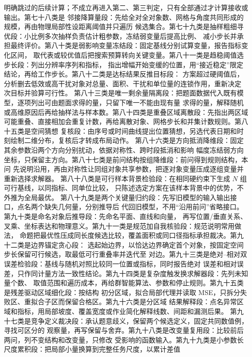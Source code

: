 明确跳过的后续计算；不成立再进入第二、第三判定，只有全部通过才计算接收或输出。第七十八类是
邻接降算量段：先给全对全对象数、网格与角度共同形成的规模，再由物理局部性设距离阈值并只遍历
候选集合。第七十九类是抽样粗细寻优段：小比例多次抽样负责估计粗参数，冻结弱变量后提高比例、
减小步长并承担最终评价。第八十类是弱影响变量冻结段：固定基线分别试算变量，报告指标变化区间，
取代表或较优值后把搜索预算转向关键变量。第八十一类是趋稳阈值选步长段：列出分辨率序列和指标，
指出增幅开始变缓的位置，用“接近稳定”限定结论，再给工作步长。第八十二类是达标结果反推目标段：
方案超过硬阈值后，分析删去低效或高干扰对象对总量、面积、干扰和单位量的连锁作用，重新决定
次目标并验算可行性。
第八十三类是唯一剩余量隔离段：把题面数据代入既有模型，逐项列出可由题面求得的量，只留下唯一不能由现有量
求得的量，解释随机或高维原因后再给抽样法与样本数。第八十四类是重叠区域离散段：先指出两区域
可能重叠、直接相加会重复计数，再给离散对象、网格步长和并集计数规则。第八十五类是空间猜想
复核段：由序号或时间曲线提出位置猜想，另选代表日期和时刻绘制二维分布，复核后才转成布局动作。
第八十六类是方向抵消降维段：固定其余参数沿两个方向分别扰动，依据对称性、跨时段抵消和影响
幅度冻结弱方向坐标，只保留主方向。第八十七类是前问结构按组降维段：前问得到规则结构，本问
先说明沿用，再由对称性让同组对象共享参数，把逐对象变量压成逐组变量并重新选择求解器。
第八十八类是可行样本背景检验段：在相同硬约束下生成 $N$ 组可行基线，以同指标、同单位比较，
只陈述选定方案在该样本背景中的优势，不外推为全局最优。
第八十九类是两个关键量归约段：先写旧模型的输入输出接口，点名两个缺失几何量，分别推导后
代回旧模型，不用“沿用前问”省略接口。第九十类是命名对象后推导段：先命名平面、直线和向量，
再写位置/垂直关系、叉乘、坐标表达和物理意义。第九十一类是规范加自我核验段：规范说明常用做法，
命题把最优性压成同长度候选比较，覆盖面积或同口径指标承担裁决。第九十二类是边界锚定贪心段：
选起始边界，以恰达边界确定首个对象，按固定空间步长保留可行候选，取最低可行重叠率并迭代至
对边。第九十三类是绝对--相对双误差检验段：基线与随机对照比较同一位置或指标，同时报告绝对
误差和相对误差，只作同计量方法一致性结论。第九十四类是复杂度触发换求解器段：先列未知量个数、
取值范围和遍历成本，再给群智能算法、参数和停止规则。第九十五类是残差驱动区域细化段：按结构
初分区域，拟合局部代理并读取 MSE，只拆分失败区、重拟合子区而保留合格区。第九十六类是分区域
结果解释段：点名异常区域和指标，用局部坡度、覆盖宽度或作业简化解释线数、间距和漏测后果。
第九十七类是竞争定义裁决段：承认题意歧义，保留两个候选定义，固定共同数值例，寻找可区分的
观察量，再写保留与舍弃。第九十八类是改变量复用段：比较前后两问，列不变结构和改变量，只修改
受影响的函数输入。第九十九类是小参数长尺度累积段：把局部小量换算到完整任务尺度，以累计差值
